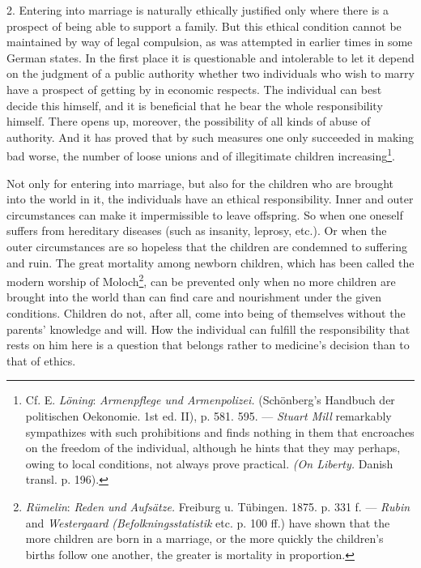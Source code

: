 \documentclass[12pt,a4paper,openany]{book}
\newcommand{\opage}[1]{\marginnote{\footnotesize\textit{[#1]}}}
\begin{document}
2. Entering into marriage is naturally ethically justified only where there is a prospect of being able to support a
family. But this ethical condition cannot be maintained by way of legal compulsion, as was attempted in earlier times in
some German states. In the first place it is questionable and intolerable to let it depend on the judgment of a public
authority whether two individuals who
\opage{301}wish to marry have a prospect of getting by in economic respects. The individual can best decide this
himself, and it is beneficial that he bear the whole responsibility himself. There opens up, moreover, the possibility
of all kinds of abuse of authority. And it has proved that by such measures one only succeeded in making bad worse, the
number of loose unions and of illegitimate children increasing\footnote[1]{Cf. E. \emph{Löning}: \textit{Armenpflege und
Armenpolizei.} (Schönberg's Handbuch der politischen Oekonomie. 1st ed. II), p. 581. 595. --- \emph{Stuart Mill}
remarkably sympathizes with such prohibitions and finds nothing in them that encroaches on the freedom of the
individual, although he hints that they may perhaps, owing to local conditions, not always prove practical. \textit{(On
Liberty.} Danish transl. p. 196).}.

Not only for entering into marriage, but also for the children who are brought into the world in it, the individuals
have an ethical responsibility. Inner and outer circumstances can make it impermissible to leave offspring. So when one
oneself suffers from hereditary diseases (such as insanity, leprosy, etc.). Or when the outer circumstances are so
hopeless that the children are condemned to suffering and ruin. The great mortality among newborn children, which has
been called the modern worship of Moloch\footnote[2]{\emph{Rümelin}: \textit{Reden und Aufsätze.} Freiburg u. Tübingen.
1875. p. 331 f. --- \emph{Rubin} and \emph{Westergaard} \textit{(Befolkningsstatistik} etc. p. 100 ff.) have shown that
the more children are born in a marriage, or the more quickly the children's births follow one another, the greater is
mortality in proportion.}, can be prevented only when no more children are brought into the world than can find care and
nourishment under the given conditions. Children do not, after all, come into being of themselves without the parents'
knowledge and will. How the individual can fulfill the responsibility that rests on him here is a question that belongs
rather to medicine's decision than to that of ethics.
\end{document}
